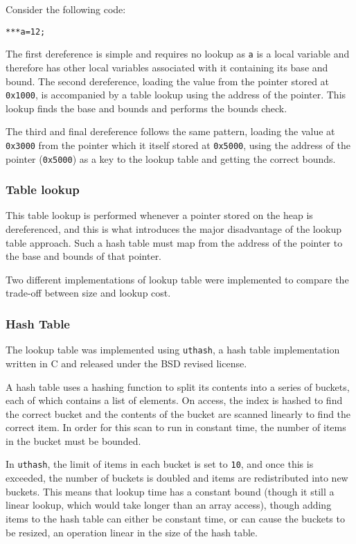 Consider the following code:

\begin{verbatim}
***a=12;
\end{verbatim}

The first dereference is simple and requires no lookup as \verb!a! is a local variable and therefore has other local variables associated with it containing its base and bound.
The second dereference, loading the value from the pointer stored at \verb!0x1000!, is accompanied by a table lookup using the address of the pointer.
This lookup finds the base and bounds and performs the bounds check.

The third and final dereference follows the same pattern, loading the value at \verb!0x3000! from the pointer which it itself stored at \verb!0x5000!, using the address of the pointer (\verb!0x5000!) as a key to the lookup table and getting the correct bounds.

\subsubsection{Table lookup}

This table lookup is performed whenever a pointer stored on the heap is dereferenced, and this is what introduces the major disadvantage of the lookup table approach.
Such a hash table must map from the address of the pointer to the base and bounds of that pointer.

Two different implementations of lookup table were implemented to compare the trade-off between size and lookup cost.

\subsubsection{Hash Table}

The lookup table was implemented using \verb!uthash!, a hash table implementation written in C and released under the BSD revised license. 

A hash table uses a hashing function to split its contents into a series of buckets, each of which contains a list of elements.
On access, the index is hashed to find the correct bucket and the contents of the bucket are scanned linearly to find the correct item.
In order for this scan to run in constant time, the number of items in the bucket must be bounded.

In \verb!uthash!, the limit of items in each bucket is set to \verb!10!, and once this is exceeded, the number of buckets is doubled and items are redistributed into new buckets.
This means that lookup time has a constant bound (though it still a linear lookup, which would take longer than an array access), though adding items to the hash table can either be constant time, or can cause the buckets to be resized, an operation linear in the size of the hash table.

